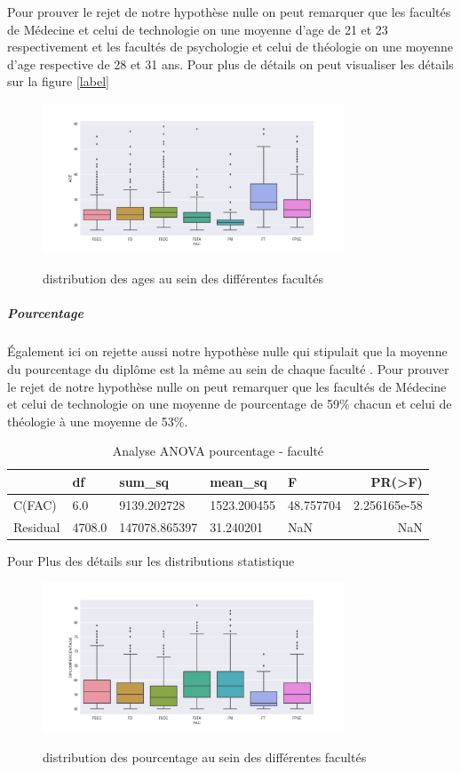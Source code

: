  Pour prouver le rejet de notre hypothèse nulle on peut remarquer que les
 facultés de Médecine et celui de technologie on une moyenne d'age de 21
 et 23 respectivement et les facultés de psychologie et celui de
 théologie on une moyenne d'age respective de 28 et 31 ans.
 Pour plus de détails on peut visualiser les détails sur la figure \ref{label}
 	\begin{figure}[!htbp]
 	\centering
 	\includegraphics[width=0.8\textwidth]{fig/AGE-FAC.png}\label{fig:ANOVAb}
 	\caption{distribution des ages au sein des différentes facultés } 
 	\end{figure}
\subparagraph{Pourcentage}
  Également ici on rejette aussi notre hypothèse nulle qui stipulait que la
moyenne du pourcentage du diplôme est la même au sein de chaque faculté
. Pour prouver le rejet de notre hypothèse nulle on peut remarquer que
les facultés de Médecine et celui de technologie on une moyenne de
pourcentage de 59\% chacun et celui de théologie à une moyenne de 53\%.
\begin{table}[!htbp]
	\centering
	\begingroup %
	\captionsetup{type=table} %
	\caption{Analyse ANOVA pourcentage - faculté}
	\label{tab:ANOVAPourcentage}
	\begin{tabular}{lllllr}
		\toprule
		{} & df     &   sum\_sq &     mean\_sq      &     F    &     PR(>F) \\
		\midrule
		C(FAC)    &   6.0  &  9139.202728  &1523.200455  &48.757704&  2.256165e-58 \\
		Residual & 4708.0 & 147078.865397 &   31.240201  &      NaN      &     NaN \\
		\bottomrule
	\end{tabular}
	\endgroup
\end{table}
Pour Plus des détails sur les distributions statistique 
\begin{figure}[!htbp]
	\centering
	\includegraphics[width=0.8\textwidth]{fig/AGE-POURC.png}\label{fig:ANOVAa}
	\caption{distribution des pourcentage au sein des différentes facultés } 
\end{figure}
